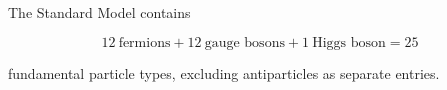 \documentclass[12pt]{article}
\begin{document}
The Standard Model contains

\begin{equation}
12\ \text{fermions} + 12\ \text{gauge bosons} + 1\ \text{Higgs boson} = 25
\end{equation}

fundamental particle types, excluding antiparticles as separate entries.
\end{document}
